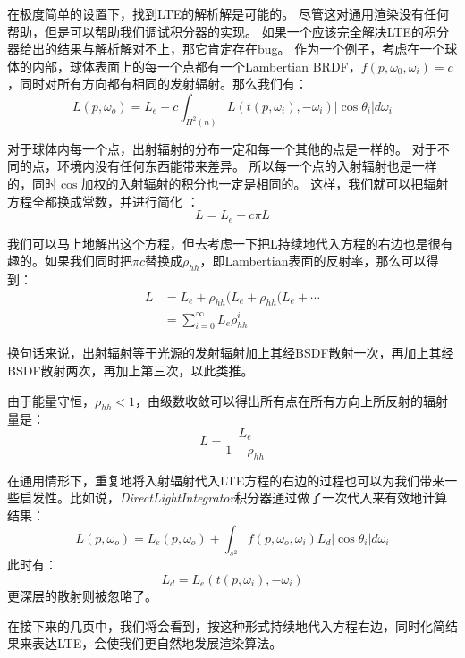 \documentclass[a4paper]{article}
\begin{document}
	在极度简单的设置下，找到LTE的解析解是可能的。
	尽管这对通用渲染没有任何帮助，但是可以帮助我们调试积分器的实现。
	如果一个应该完全解决LTE的积分器给出的结果与解析解对不上，那它肯定存在bug。
	作为一个例子，考虑在一个球体的内部，球体表面上的每一个点都有一个Lambertian BRDF，$f(p,\omega_0,\omega_i)=c$，同时对所有方向都有相同的发射辐射。那么我们有：
	\begin{equation*}
		L(p,\omega_o)=L_e+c\int_{H^2(n)}L(t(p,\omega_i),-\omega_i)|\cos\theta_i|d\omega_i
	\end{equation*}

	对于球体内每一个点，出射辐射的分布一定和每一个其他的点是一样的。
	对于不同的点，环境内没有任何东西能带来差异。
	所以每一个点的入射辐射也是一样的，同时$\cos$加权的入射辐射的积分也一定是相同的。
	这样，我们就可以把辐射方程全都换成常数，并进行简化 ：
	\begin{equation*}
		L=L_e+c\pi L
	\end{equation*}

	我们可以马上地解出这个方程，但去考虑一下把L持续地代入方程的右边也是很有趣的。如果我们同时把$\pi c$替换成$\rho_{hh}$，即Lambertian表面的反射率，那么可以得到：
	\begin{equation*}
		\begin{split}
			L&=L_e+\rho_{hh}(L_e+\rho_{hh}(L_e+\cdots\\
			 &=\sum^\infty_{i=0}L_e\rho^i_{hh}
		\end{split}
	\end{equation*}

	换句话来说，出射辐射等于光源的发射辐射加上其经BSDF散射一次，再加上其经BSDF散射两次，再加上第三次，以此类推。

	由于能量守恒，$\rho_{hh}<1$，由级数收敛可以得出所有点在所有方向上所反射的辐射量是：
	\begin{equation*}
		L=\frac{L_e}{1-\rho_{hh}}
	\end{equation*}

	在通用情形下，重复地将入射辐射代入LTE方程的右边的过程也可以为我们带来一些启发性。比如说，\textit{DirectLightIntegrator}积分器通过做了一次代入来有效地计算结果：
	\begin{equation*}
		L(p,\omega_o)=L_e(p,\omega_o)+\int_{s^2}f(p,\omega_o,\omega_i)L_d|\cos\theta_i|d\omega_i
	\end{equation*}
	此时有：
	\begin{equation*}
		L_d=L_e(t(p,\omega_i),-\omega_i)
	\end{equation*}
	更深层的散射则被忽略了。

	在接下来的几页中，我们将会看到，按这种形式持续地代入方程右边，同时化简结果来表达LTE，会使我们更自然地发展渲染算法。
	
\end{document}
